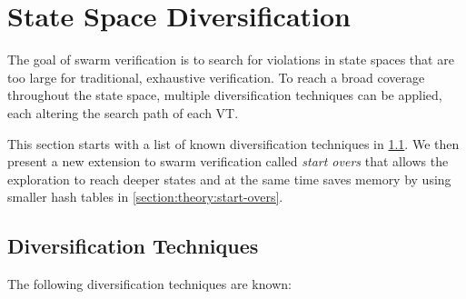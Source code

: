 \documentclass[
fancyheadings, %
%
%
]{stsreprt}
\begin{document}

\section{State Space Diversification}
\label{section:theory:state-space-diversification}

The goal of swarm verification is to search for violations in state spaces that are too large for traditional, exhaustive verification.
To reach a broad coverage throughout the state space, multiple diversification techniques can be applied, each altering the search path of each VT.

This section starts with a list of known diversification techniques in \cref{section:theory:diversification-techniques}.
We then present a new extension to swarm verification called \emph{start overs} that allows the exploration to reach deeper states and at the same time saves memory by using smaller hash tables in \cref{section:theory:start-overs}.


\subsection{Diversification Techniques}
\label{section:theory:diversification-techniques}

The following diversification techniques are known: \cite{Holzmann2011.Swarm-Verification-Techniques,DeFrancisco2020.Grapple}
\end{document}
